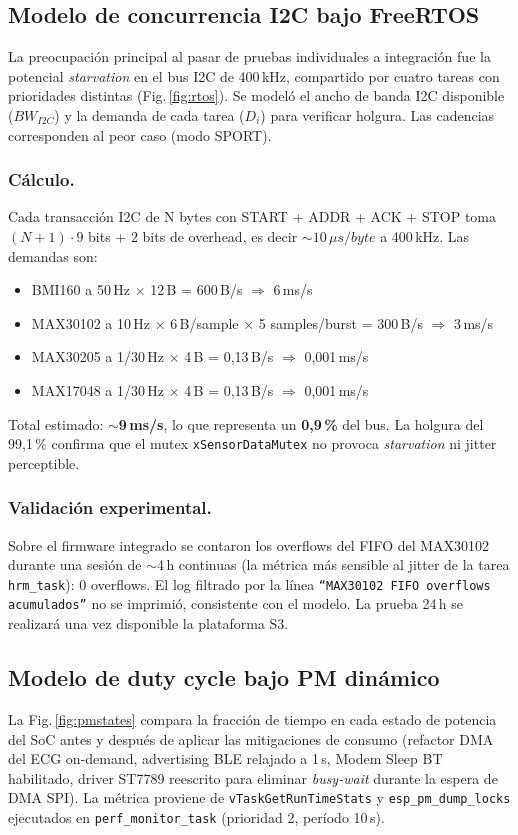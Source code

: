 \documentclass[letterpaper,11pt]{article}
\newcommand{\rfigura}[1]{Fig.\,\ref{#1}}
\begin{document}
\subsection{Modelo de concurrencia I2C bajo FreeRTOS}
La preocupación principal al pasar de pruebas individuales a integración fue la potencial
\textit{starvation} en el bus I2C de 400\,kHz, compartido por cuatro tareas con prioridades
distintas (\rfigura{fig:rtos}). Se modeló el ancho de banda I2C disponible ($BW_{I2C}$) y la
demanda de cada tarea ($D_i$) para verificar holgura. Las cadencias corresponden al peor caso
(modo SPORT).

\subsubsection{Cálculo.} Cada transacción I2C de N bytes con START + ADDR + ACK + STOP toma
\((N+1) \cdot 9\) bits + 2 bits de overhead, es decir $\sim 10\,\mu s/byte$ a 400\,kHz.
Las demandas son:
\begin{itemize}
    \item BMI160 a 50\,Hz $\times$ 12\,B = 600\,B/s $\Rightarrow$ 6\,ms/s
    \item MAX30102 a 10\,Hz $\times$ 6\,B/sample $\times$ 5 samples/burst = 300\,B/s $\Rightarrow$ 3\,ms/s
    \item MAX30205 a 1/30\,Hz $\times$ 4\,B = 0,13\,B/s $\Rightarrow$ 0,001\,ms/s
    \item MAX17048 a 1/30\,Hz $\times$ 4\,B = 0,13\,B/s $\Rightarrow$ 0,001\,ms/s
\end{itemize}
Total estimado: \textbf{$\sim$9\,ms/s}, lo que representa un \textbf{0,9\,\%} del bus.
La holgura del 99,1\,\% confirma que el mutex \texttt{xSensorDataMutex} no provoca
\textit{starvation} ni jitter perceptible.

\subsubsection{Validación experimental.} Sobre el firmware integrado se contaron los overflows
del FIFO del MAX30102 durante una sesión de $\sim$4\,h continuas (la métrica más sensible al
jitter de la tarea \texttt{hrm\_task}): 0 overflows. El log filtrado por la línea
\texttt{``MAX30102 FIFO overflows acumulados''} no se imprimió, consistente con el modelo.
La prueba 24\,h se realizará una vez disponible la plataforma S3.

\subsection{Modelo de duty cycle bajo PM dinámico}
\label{sec:pm}
La \rfigura{fig:pmstates} compara la fracción de tiempo en cada estado de potencia del SoC
antes y después de aplicar las mitigaciones de consumo (refactor DMA del ECG on-demand,
advertising BLE relajado a 1\,s, Modem Sleep BT habilitado, driver ST7789 reescrito para
eliminar \textit{busy-wait} durante la espera de DMA SPI). La métrica proviene de
\texttt{vTaskGetRunTimeStats} y \texttt{esp\_pm\_dump\_locks} ejecutados en
\texttt{perf\_monitor\_task} (prioridad 2, período 10\,s).
\end{document}
